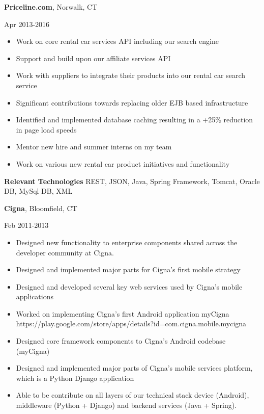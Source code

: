 \documentclass[a4paper,online]{adcv}
\begin{document}
\begin{adcvtabletwo}
  \adcvrowskip
  {\textbf{Priceline.com}, Norwalk, CT}
  
   {Apr 2013-2016}
  \begin{itemize}
    \item Work on core rental car services API including our search engine
    \item Support and build upon our affiliate services API
    \item Work with suppliers to integrate their products into our rental car search service
    \item Significant contributions towards replacing older EJB based infrastructure
    \item Identified and implemented database caching resulting in a +25\% reduction in page load speeds
    \item Mentor new hire and summer interns on my team
    \item Work on various new rental car product initiatives and functionality
  \end{itemize}
  \adcvrowskip
  \textbf{Relevant Technologies} REST, JSON, Java, Spring Framework, Tomcat, Oracle DB, MySql DB, XML
  
  \adcvrowskip
  {\textbf{Cigna}, Bloomfield, CT}
  
   {Feb 2011-2013}
  \begin{itemize}
    \item Designed new functionality to enterprise components shared across the developer community at Cigna.
    \item Designed and implemented major parts for Cigna’s first mobile strategy
    \item Designed and developed several key web services used by Cigna’s mobile applications
    \item Worked on implementing Cigna’s first Android application myCigna https://play.google.com/store/apps/details?id=com.cigna.mobile.mycigna
    \item Designed core framework components to Cigna’s Android codebase (myCigna)
    \item Designed and implemented major parts of Cigna’s mobile services platform, which is a Python Django application
    \item Able to be contribute on all layers of our technical stack device (Android), middleware (Python + Django) and backend services (Java + Spring).


\end{itemize}
\end{adcvtabletwo}
\end{document}

